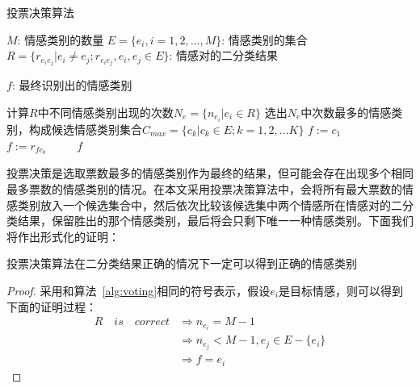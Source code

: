 \begin{algorithm}[htb]
    \caption{投票决策算法}
    \label{alg:voting}
    
    \begin{algorithmic}[1]
        \Require %
            \Statex $M$: 情感类别的数量 
            \Statex $E = \{e_i, i=1,2,...,M\}$: 情感类别的集合
            \Statex $R = \{r_{e_ie_j}|e_i \neq e_j; r_{e_ie_j}, e_i, e_j \in E\}$: 情感对的二分类结果

        \Ensure %
            \Statex $f$: 最终识别出的情感类别

        \Statex
        \State  计算$R$中不同情感类别出现的次数$N_e = \{n_{e_i}|e_i \in R\}$ %
        \State  选出$N_e$中次数最多的情感类别，构成候选情感类别集合$C_{max} = \{c_k|c_k \in E; k = 1,2,...K\}$
        \State  $f := c_1$
                \State $f := r_{fc_k}$
            \EndFor
    　　 \EndIf
        \State \Return $f$
    \end{algorithmic}
\end{algorithm}

投票决策是选取票数最多的情感类别作为最终的结果，但可能会存在出现多个相同最多票数的情感类别的情况。在本文采用投票决策算法中，会将所有最大票数的情感类别放入一个候选集合中，然后依次比较该候选集中两个情感所在情感对的二分类结果，保留胜出的那个情感类别，最后将会只剩下唯一一种情感类别。下面我们将作出形式化的证明：

\begin{proposition}
    投票决策算法在二分类结果正确的情况下一定可以得到正确的情感类别
\end{proposition}
\begin{proof}
    采用和算法~\ref{alg:voting}相同的符号表示，假设$e_i$是目标情感，则可以得到下面的证明过程：
    \[
        \begin{aligned}
            R \quad is \quad correct &\Rightarrow n_{e_i} = M - 1 \\
            &\Rightarrow n_{e_j} < M - 1, e_j \in E - \{e_i\} \\
            &\Rightarrow f = e_i
        \end{aligned}
    \]
\end{proof}

